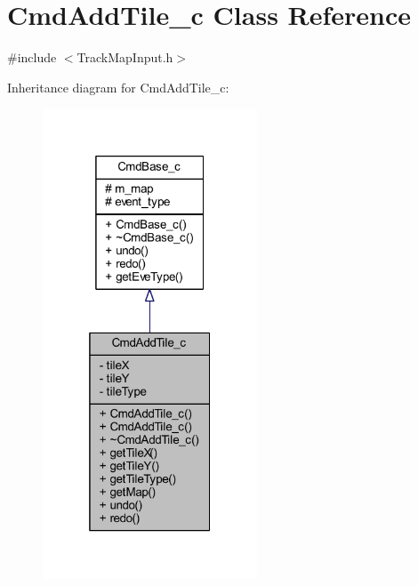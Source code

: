 \hypertarget{class_cmd_add_tile__c}{\section{Cmd\+Add\+Tile\+\_\+c Class Reference}
\label{class_cmd_add_tile__c}
}


{\ttfamily \#include $<$Track\+Map\+Input.\+h$>$}



Inheritance diagram for Cmd\+Add\+Tile\+\_\+c\+:\nopagebreak
\begin{figure}[H]
\begin{center}
\leavevmode
\includegraphics[width=181pt]{class_cmd_add_tile__c__inherit__graph}
\end{center}
\end{figure}


